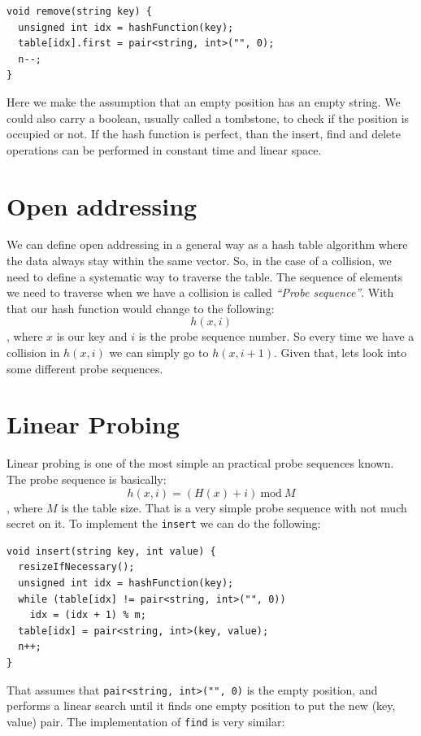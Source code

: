 \begin{lstlisting}
void remove(string key) {
  unsigned int idx = hashFunction(key);
  table[idx].first = pair<string, int>("", 0);
  n--;
}
\end{lstlisting}

Here we make the assumption that an empty position has an empty string. We could also carry a boolean, usually called a tombstone, to check if the position is occupied or not. If the hash function is perfect, than the insert, find and delete operations can be performed in constant time and linear space.

\section{Open addressing}

We can define open addressing in a general way as a hash table algorithm where the data always stay within the same vector. So, in the case of a collision, we need to define a systematic way to traverse the table. The sequence of elements we need to traverse when we have a collision is called \textit{``Probe sequence''}. With that our hash function would change to the following:
\[ h(x, i) \],
where \( x \) is our key and \( i \) is the probe sequence number. So every time we have a collision in \( h(x, i) \) we can simply go to \( h(x, i + 1) \). Given that, lets look into some different probe sequences.

\section{Linear Probing}

Linear probing is one of the most simple an practical probe sequences known. The probe sequence is basically:
\[ h(x, i) = (H(x) + i) ~\mathrm{mod}~ M \],
where \( M \) is the table size. That is a very simple probe sequence with not much secret on it. To implement the \texttt{insert} we can do the following:

\begin{lstlisting}
void insert(string key, int value) {
  resizeIfNecessary();
  unsigned int idx = hashFunction(key);
  while (table[idx] != pair<string, int>("", 0))
    idx = (idx + 1) % m;      
  table[idx] = pair<string, int>(key, value);
  n++;
}
\end{lstlisting}

That assumes that \texttt{pair<string, int>("", 0)} is the empty position, and performs a linear search until it finds one empty position to put the new (key, value) pair. The implementation of \texttt{find} is very similar:

